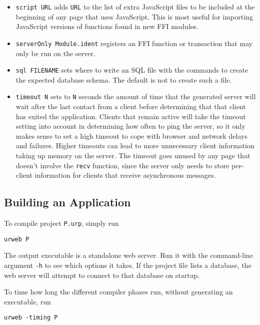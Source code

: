 \documentclass{article}
\begin{document}
\begin{itemize}
\item \texttt{script URL} adds \texttt{URL} to the list of extra JavaScript files to be included at the beginning of any page that uses JavaScript.  This is most useful for importing JavaScript versions of functions found in new FFI modules.
\item \texttt{serverOnly Module.ident} registers an FFI function or transaction that may only be run on the server.
\item \texttt{sql FILENAME} sets where to write an SQL file with the commands to create the expected database schema.  The default is not to create such a file.
\item \texttt{timeout N} sets to \texttt{N} seconds the amount of time that the generated server will wait after the last contact from a client before determining that that client has exited the application.  Clients that remain active will take the timeout setting into account in determining how often to ping the server, so it only makes sense to set a high timeout to cope with browser and network delays and failures.  Higher timeouts can lead to more unnecessary client information taking up memory on the server.  The timeout goes unused by any page that doesn't involve the \texttt{recv} function, since the server only needs to store per-client information for clients that receive asynchronous messages.
\end{itemize}


\subsection{Building an Application}

To compile project \texttt{P.urp}, simply run
\begin{verbatim}
urweb P
\end{verbatim}
The output executable is a standalone web server.  Run it with the command-line argument \texttt{-h} to see which options it takes.  If the project file lists a database, the web server will attempt to connect to that database on startup.

To time how long the different compiler phases run, without generating an executable, run
\begin{verbatim}
urweb -timing P
\end{verbatim}
\end{document}
